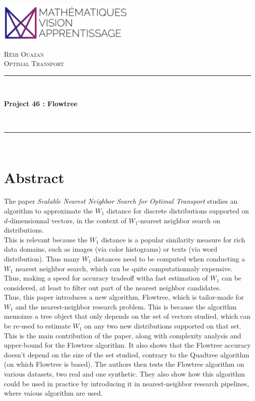 \documentclass[11pt]{article}
\begin{document}
\begin{titlepage}
\centering

\includegraphics[width=0.5\textwidth]{imgs/mva.png}
\par\vspace{1cm}

{\scshape\LARGE Rémi Ouazan \\ Optimal Transport \par} 
\vspace{0.5cm}

\rule{\linewidth}{0.2 mm} \\[0.4 cm]
{\huge\bfseries Project 46 : Flowtree \par} \
\rule{\linewidth}{0.2 mm} \\[1.0 cm]

\section*{Abstract}

\justifying
The paper \textit{Scalable Nearest Neighbor Search for Optimal Transport} \cite{Flowtree} studies an algorithm to approximate the $W_1$ distance for discrete distributions supported on $d$-dimensionnal vectors, in the context of $W_1$-nearest neighbor search on distributions.\\
This is relevant because the $W_1$ distance is a popular similarity measure for rich data domains, such as images (via color histograms) or texts (via word distribution). Thus many $W_1$ distances need to be computed when conducting a $W_1$ nearest neighbor search, which can be quite computationnaly expensive. Thus, making a speed for accuracy tradeoff witha fast estimation of $W_1$ can be considered, at least to filter out part of the nearest neighbor candidates.\\
Thus, this paper introduces a new algorithm, Flowtree, which is tailor-made for $W_1$ and the nearest-neighbor research problem. This is because the algorithm memoizes a tree object that only depends on the set of vectors studied, which can be re-used to estimate $W_1$ on any two new distributions supported on that set.\\
This is the main contribution of the paper, along with complexity analysis and upper-bound for the Flowtree algorithm. It also shows that the Flowtree accuracy doesn't depend on the size of the set studied, contrary to the Quadtree algorithm (on which Flowtree is based). The authors then tests the Flowtree algorithm on various datasets, two real and one synthetic. They also show how this algorithm could be used in practice by introducing it in nearest-neighbor research pipelines, where vaious algorithm are used.
\\


\end{titlepage}
\end{document}
